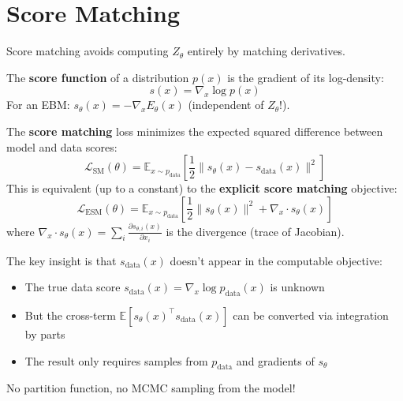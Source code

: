 \section{Score Matching}

Score matching avoids computing $Z_\theta$ entirely by matching derivatives.

\begin{definition}
    The \textbf{score function} of a distribution $p(x)$ is the gradient of its log-density:
    \[
        s(x) = \nabla_x \log p(x)
    \]
    For an EBM: $s_\theta(x) = -\nabla_x E_\theta(x)$ (independent of $Z_\theta$!).
\end{definition}

\begin{theorem}
    The \textbf{score matching} loss minimizes the expected squared difference between model and data scores:
    \[
        \mathcal{L}_{\text{SM}}(\theta) = \mathbb{E}_{x \sim p_{\text{data}}}\left[ \frac{1}{2} \| s_\theta(x) - s_{\text{data}}(x) \|^2 \right]
    \]
    This is equivalent (up to a constant) to the \textbf{explicit score matching} objective:
    \[
        \mathcal{L}_{\text{ESM}}(\theta) = \mathbb{E}_{x \sim p_{\text{data}}}\left[ \frac{1}{2} \| s_\theta(x) \|^2 + \nabla_x \cdot s_\theta(x) \right]
    \]
    where $\nabla_x \cdot s_\theta(x) = \sum_i \frac{\partial s_{\theta,i}(x)}{\partial x_i}$ is the divergence (trace of Jacobian).
\end{theorem}

\begin{remark}
    The key insight is that $s_{\text{data}}(x)$ doesn't appear in the computable objective:
    \begin{itemize}
        \item The true data score $s_{\text{data}}(x) = \nabla_x \log p_{\text{data}}(x)$ is unknown
        \item But the cross-term $\mathbb{E}[s_\theta(x)^\top s_{\text{data}}(x)]$ can be converted via integration by parts
        \item The result only requires samples from $p_{\text{data}}$ and gradients of $s_\theta$
    \end{itemize}
    No partition function, no MCMC sampling from the model!
\end{remark}

